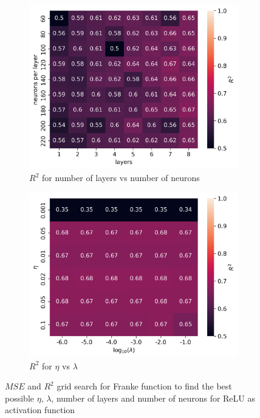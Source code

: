 \documentclass[11pt]{article}
\begin{document}
\begin{figure}[H]
    \begin{subfigure}{.5\textwidth}
        \centering
        \includegraphics[width=\textwidth]{../figures/franke_L_n_test_relu_R2.png}
        \caption{$R^2$ for number of layers vs number of neurons}
        \label{fig:}
    \end{subfigure}
    \begin{subfigure}{.5\textwidth}
        \centering
        \includegraphics[width=\textwidth]{../figures/franke_eta_lmb_relu_R2.png}
        \caption{$R^2$ for $\eta$ vs $\lambda$}
        \label{fig:}
    \end{subfigure}
    \caption{$MSE$ and $R^2$ grid search for Franke function to find the best possible $\eta$, $\lambda$, number of layers and number of neurons for ReLU as activation function}
    \label{fig:franke_grid_2}
\end{figure}
\end{document}
